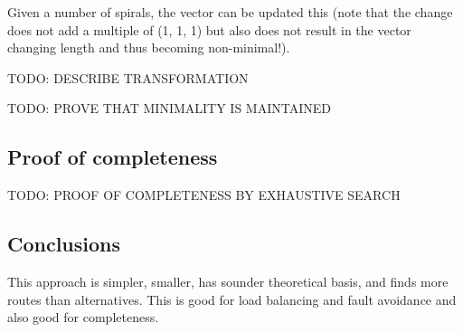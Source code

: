 			Given a number of spirals, the vector can be updated this (note that the
			change does not add a multiple of (1, 1, 1) but also does not result in
			the vector changing length and thus becoming non-minimal!).
			
			TODO: DESCRIBE TRANSFORMATION
			
			TODO: PROVE THAT MINIMALITY IS MAINTAINED
		
		\subsection{Proof of completeness}
		
			TODO: PROOF OF COMPLETENESS BY EXHAUSTIVE SEARCH
	
		\subsection{Conclusions}
			
			This approach is simpler, smaller, has sounder theoretical basis, and
			finds more routes than alternatives. This is good for load balancing and
			fault avoidance and also good for completeness.

